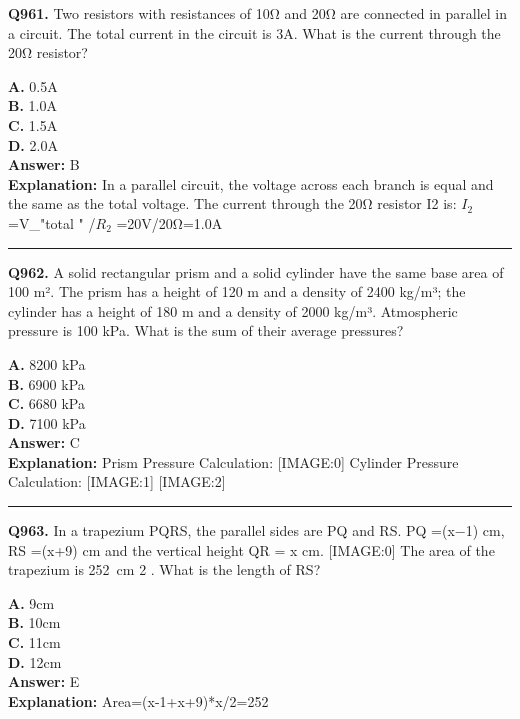 \documentclass[12pt]{article}
\begin{document}
\noindent
\textbf{Q961.} Two resistors with resistances of 10Ω and 20Ω are connected in parallel in a circuit. The total current in the circuit is 3A. What is the current through the 20Ω resistor?



\textbf{A.} 0.5A \\
\textbf{B.} 1.0A \\
\textbf{C.} 1.5A \\
\textbf{D.} 2.0A \\

\textbf{Answer:} B \\
\textbf{Explanation:} In a parallel circuit, the voltage across each branch is equal and the same as the total voltage. The current through the 20Ω resistor I2 is: $I_2$=V_"total " /$R_2$ =20V/20Ω=1.0A

\hrule
\vspace{1em}


\noindent
\textbf{Q962.} A solid rectangular prism and a solid cylinder have the same base area of 100 m². The prism has a height of 120 m and a density of 2400 kg/m³; the cylinder has a height of 180 m and a density of 2000 kg/m³. Atmospheric pressure is 100 kPa. What is the sum of their average pressures?



\textbf{A.} 8200 kPa \\
\textbf{B.} 6900 kPa \\
\textbf{C.} 6680 kPa \\
\textbf{D.} 7100 kPa \\

\textbf{Answer:} C \\
\textbf{Explanation:} Prism Pressure Calculation:
[IMAGE:0]
Cylinder Pressure Calculation:
[IMAGE:1]
[IMAGE:2]

\hrule
\vspace{1em}


\noindent
\textbf{Q963.} In a trapezium PQRS, the parallel sides are PQ and RS. PQ =(x−1) cm, RS =(x+9) cm and the vertical height QR = x cm.
[IMAGE:0]
The area of the trapezium is 252 cm
2
. What is the length of RS?



\textbf{A.} 9cm \\
\textbf{B.} 10cm \\
\textbf{C.} 11cm \\
\textbf{D.} 12cm \\

\textbf{Answer:} E \\
\textbf{Explanation:} Area=(x-1+x+9)*x/2=252
\end{document}
